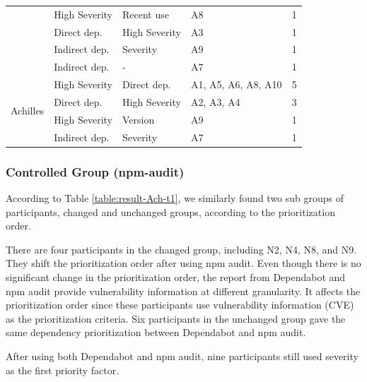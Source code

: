 \documentclass[conference]{IEEEtran}
\begin{document}
\begin{table}[tb]
{\begin{tabular}{cp{2cm}p{2cm}p{1.5cm}r}
				& High Severity & Recent use                      & A8                                            & 1               \\ 
				& Direct dep.  & High Severity                   & A3                                            & 1               \\ 
				& Indirect dep. & Severity                        & A9                                            & 1               \\ 
				& Indirect dep. & - & A7                                            & 1               \\ 
				\midrule
				\multirow{5}{*}{Achilles}  & High Severity & Direct dep.                          & A1, A5, A6, A8, A10                           & 5               \\ 
				& Direct dep.  & High Severity                   & A2, A3, A4 & 3               \\ 
				& High Severity & Version                         & A9                                            & 1               \\ 
				& Indirect dep. & Severity                        & A7                                            & 1               \\ 
				\bottomrule
			\end{tabular}
		}
		\label{table:prioritization_factor}
	\end{table}
	
	\subsubsection{Controlled Group (npm-audit)}
	According to Table \ref{table:result-Ach-t1}, we similarly found two sub groups of participants, changed and unchanged groups, according to the prioritization order.
	
	There are four participants in the changed group, including N2, N4, N8, and N9. They shift the prioritization order after using npm audit. Even though there is no significant change in the prioritization order, the report from Dependabot and npm audit provide vulnerability information at different granularity. It affects the prioritization order since these participants use vulnerability information (CVE) as the prioritization criteria. Six participants in the unchanged group gave the same dependency prioritization between Dependabot and npm audit.
	
	After using both Dependabot and npm audit, nine participants still used severity as the first priority factor.
	
\end{document}

